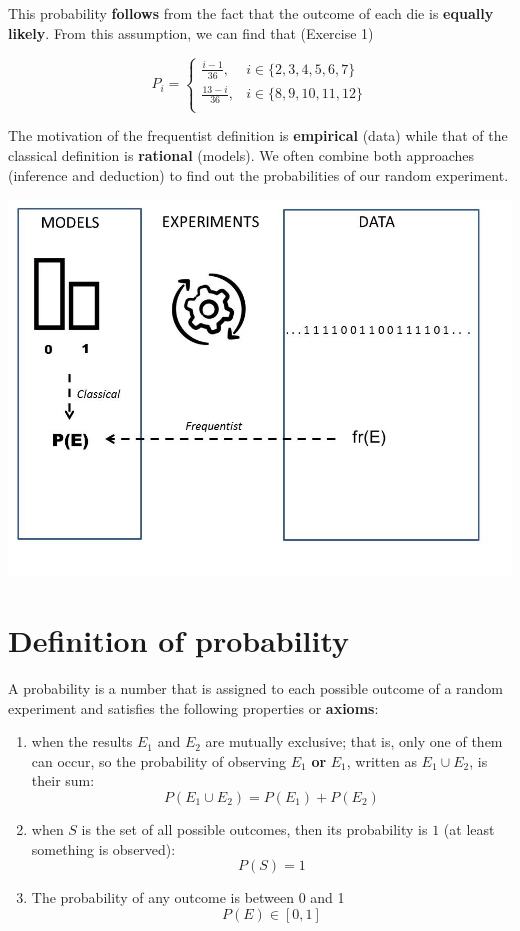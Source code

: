 \documentclass[
]{book}
\providecommand{\tightlist}{%
  \setlength{\itemsep}{0pt}\setlength{\parskip}{0pt}}
\begin{document}
This probability \textbf{follows} from the fact that the outcome of each die is \textbf{equally likely}. From this assumption, we can find that (Exercise 1)

\[
    P_i =
\begin{cases}
\frac{i-1}{36},& i \in \{2,3,4,5,6, 7\} \\
\frac{13-i}{36},& i \in \{8,9,10,11,12\} \\
\end{cases}
\]

The motivation of the frequentist definition is \textbf{empirical} (data) while that of the classical definition is \textbf{rational} (models). We often combine both approaches (inference and deduction) to find out the probabilities of our random experiment.

\includegraphics{./figures/prob.JPG}

\hypertarget{definition-of-probability}{%
\section{Definition of probability}\label{definition-of-probability}}

A probability is a number that is assigned to each possible outcome of a random experiment and satisfies the following properties or \textbf{axioms}:

\begin{enumerate}
\def\labelenumi{\arabic{enumi})}
\tightlist
\item
  when the results \(E_1\) and \(E_2\) are mutually exclusive; that is, only one of them can occur, so the probability of observing \(E_1\) \textbf{or} \(E_1\), written as \(E_1\cup E_2\), is their sum:
  \[ P( E_1\cup E_2) = P(E_1) + P(E_2)\]
\item
  when \(S\) is the set of all possible outcomes, then its probability is \(1\) (at least something is observed): \[P(S)=1\]
\item
  The probability of any outcome is between 0 and 1 \[P(E) \in [0,1]\]
\end{enumerate}
\end{document}
